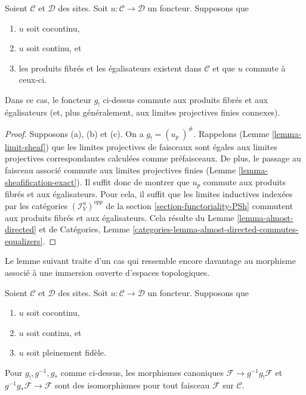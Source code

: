 \begin{lemma}
\label{lemma-preserve-equalizers}
Soient $\mathcal{C}$ et $\mathcal{D}$ des sites.
Soit $u : \mathcal{C} \to \mathcal{D}$ un foncteur.
Supposons que
\begin{enumerate}
\item[(a)] $u$ soit cocontinu,
\item[(b)] $u$ soit continu, et
\item[(c)] les produits fibrés et les égalisateurs existent dans
$\mathcal{C}$ et que $u$ commute à ceux-ci.
\end{enumerate}
Dans ce cas, le foncteur $g_!$ ci-dessus commute aux produits fibrés et aux
égalisateurs (et, plus généralement, aux limites projectives finies connexes).
\end{lemma}

\begin{proof}
Supposons (a), (b) et (c).
On a $g_! = (u_p\ )^\#$. Rappelons (Lemme \ref{lemma-limit-sheaf}) que les
limites projectives de faisceaux sont égales aux limites projectives
correspondantes calculées comme préfaisceaux. De plus, le passage au faisceau
associé commute aux limites projectives finies
(Lemme \ref{lemma-sheafification-exact}). Il suffit donc de montrer que $u_p$
commute aux produits fibrés et aux égalisateurs. Pour cela, il suffit que les
limites inductives indexées par les catégories
$(\mathcal{I}_V^u)^{opp}$ de la
section \ref{section-functoriality-PSh}
commutent aux produits fibrés et aux égalisateurs. Cela résulte du
Lemme \ref{lemma-almost-directed} et de Catégories,
Lemme \ref{categories-lemma-almost-directed-commutes-equalizers}.
\end{proof}

\noindent
Le lemme suivant traite d’un cas qui ressemble encore davantage au morphisme
associé à une immersion ouverte d’espaces topologiques.

\begin{lemma}
\label{lemma-back-and-forth}
Soient $\mathcal{C}$ et $\mathcal{D}$ des sites.
Soit $u : \mathcal{C} \to \mathcal{D}$ un foncteur.
Supposons que
\begin{enumerate}
\item[(a)] $u$ soit cocontinu,
\item[(b)] $u$ soit continu, et
\item[(c)] $u$ soit pleinement fidèle.
\end{enumerate}
Pour $g_!, g^{-1}, g_*$ comme ci-dessus, les morphismes canoniques
$\mathcal{F} \to g^{-1}g_!\mathcal{F}$ et
$g^{-1}g_*\mathcal{F} \to \mathcal{F}$ sont des isomorphismes pour tout
faisceau $\mathcal{F}$ sur $\mathcal{C}$.
\end{lemma}

